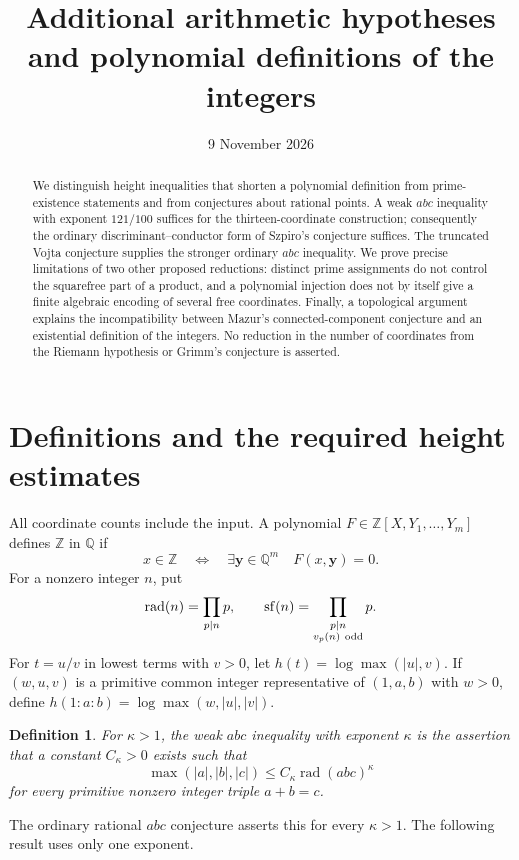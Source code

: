 \documentclass[11pt,a4paper]{article}
\title{Additional arithmetic hypotheses\\and polynomial definitions of the integers}
\author{}\date{9 November 2026}
\newtheorem{definition}[theorem]{Definition}
\newcommand{\Q}{\mathbb Q}\newcommand{\Z}{\mathbb Z}
\DeclareMathOperator{\rad}{rad}
\DeclareMathOperator{\sfpart}{sf}
\begin{document}
\maketitle
\begin{abstract}
We distinguish height inequalities that shorten a polynomial definition
from prime-existence statements and from conjectures about rational
points. A weak $abc$ inequality with exponent $121/100$ suffices for
the thirteen-coordinate construction; consequently the ordinary
discriminant--conductor form of Szpiro's conjecture suffices.
The truncated Vojta conjecture supplies the stronger ordinary $abc$
inequality. We prove precise limitations of two other proposed
reductions: distinct prime assignments do not control the squarefree
part of a product, and a polynomial injection does not by itself
give a finite algebraic encoding of several free coordinates.
Finally, a topological argument explains the incompatibility between
Mazur's connected-component conjecture and an existential definition
of the integers. No reduction in the number of coordinates from the
Riemann hypothesis or Grimm's conjecture is asserted.
\end{abstract}

\section{Definitions and the required height estimates}

All coordinate counts include the input. A polynomial
$F\in\Z[X,Y_1,\ldots,Y_m]$ defines $\Z$ in $\Q$ if
\[
 x\in\Z\quad\Longleftrightarrow\quad
 \exists\mathbf y\in\Q^m\quad F(x,\mathbf y)=0.
\]
For a nonzero integer $n$, put
\[
 \rad(n)=\prod_{p\mid n}p,\qquad
 \sfpart(n)=\prod_{\substack{p\mid n\\v_p(n)\ {\rm odd}}}p.
\]
For $t=u/v$ in lowest terms with $v>0$, let
$h(t)=\log\max(|u|,v)$. If $(w,u,v)$ is a primitive common
integer representative of $(1,a,b)$ with $w>0$, define
$h(1:a:b)=\log\max(w,|u|,|v|)$.

\begin{definition}
For $\kappa>1$, the weak $abc$ inequality with exponent $\kappa$
is the assertion that a constant $C_\kappa>0$ exists such that
\[
 \max(|a|,|b|,|c|)
 \le C_\kappa\rad(abc)^\kappa
\]
for every primitive nonzero integer triple $a+b=c$.
\end{definition}

The ordinary rational $abc$ conjecture asserts this for every
$\kappa>1$. The following result uses only one exponent.
\end{document}

